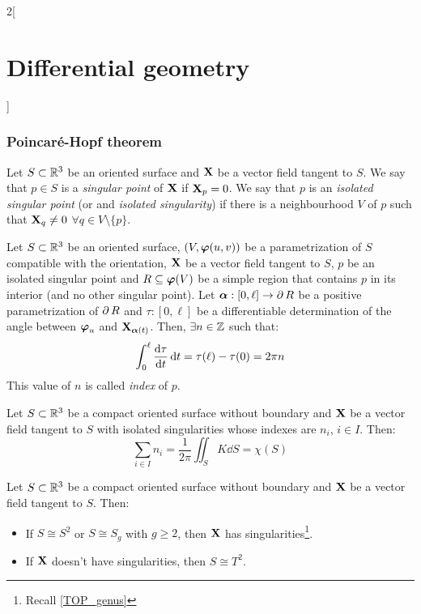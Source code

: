 \documentclass[../../../main.tex]{subfiles}
\begin{document}
\begin{multicols}{2}[\section{Differential geometry}]
  \subsubsection{Poincaré-Hopf theorem}
  \begin{definition}
    Let $S\subset\mathbb{R}^3$ be an oriented surface and $\boldsymbol{\mathrm{X}}$ be a vector field tangent to $S$. We say that $p\in S$ is a \emph{singular point} of $\boldsymbol{\mathrm{X}}$ if $\boldsymbol{\mathrm{X}}_p=0$. We say that $p$ is an \emph{isolated singular point} (or and \emph{isolated singularity}) if there is a neighbourhood $V$ of $p$ such that $\boldsymbol{\mathrm{X}}_q\ne 0$ $\forall q\in V\setminus\{p\}$.
  \end{definition}
  \begin{proposition}
    Let $S\subset\mathbb{R}^3$ be an oriented surface, $(V,\boldsymbol{\mathrm{\varphi}}(u,v))$ be a parametrization of $S$ compatible with the orientation, $\boldsymbol{\mathrm{X}}$ be a vector field tangent to $S$, $p$ be an isolated singular point and $R\subseteq \boldsymbol{\mathrm{\varphi}}(V)$ be a simple region that contains $p$ in its interior (and no other singular point). Let $\boldsymbol{\mathrm{\alpha}}:[0,\ell]\rightarrow\operatorname{\partial}{R}$ be a positive parametrization of $\operatorname{\partial}{R}$ and $\tau:[0,\ell]$ be a differentiable determination of the angle between $\boldsymbol{\mathrm{\varphi}}_u$ and $\boldsymbol{\mathrm{X}}_{\boldsymbol{\mathrm{\alpha}}(t)}$. Then, $\exists n\in\mathbb{Z}$ such that: $$\int_0^\ell\dv{\tau}{t}\dd{t}=\tau(\ell)-\tau(0)=2\pi n$$
    This value of $n$ is called \emph{index} of $p$.
  \end{proposition}
  \begin{theorem}
    Let $S\subset\mathbb{R}^3$ be a compact oriented surface without boundary and $\boldsymbol{\mathrm{X}}$ be a vector field tangent to $S$ with isolated singularities whose indexes are $n_i$, $i\in I$. Then: $$\sum_{i\in I}n_i=\frac{1}{2\pi}\iint_SK\dd{S}=\chi(S)$$
  \end{theorem}
  \begin{corollary}
    Let $S\subset\mathbb{R}^3$ be a compact oriented surface without boundary and $\boldsymbol{\mathrm{X}}$ be a vector field tangent to $S$. Then:
    \begin{itemize}
      \item If $S\cong S^2$ or $S\cong S_g$ with $g\geq 2$, then $\boldsymbol{\mathrm{X}}$ has singularities\footnote{Recall \cref{TOP_genus}}.
      \item If $\boldsymbol{\mathrm{X}}$ doesn't have singularities, then $S\cong T^2$.
    \end{itemize}
  \end{corollary}
\end{multicols}
\end{document}
